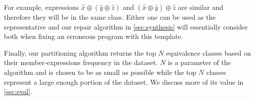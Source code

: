 For example, expressions $\hat{x} \oplus (\hat{y} \oplus \hat{z})$ and $(\hat{x}
\oplus \hat{y}) \oplus \hat{z}$ are similar and therefore they will be in the
same class. Either one can be used as the representative and our repair
algorithm in \autoref{sec:synthesis} will essentially consider both when fixing
an erroneous program with this template.

Finally, our partitioning algorithm returns the top $N$ equivalence classes
based on their member-expressions frequency in the dataset. $N$ is a parameter
of the algorithm and is chosen to be as small as possible while the top $N$
classes represent a large enough portion of the dataset. We discuss more of its
value in \autoref{sec:eval}.
